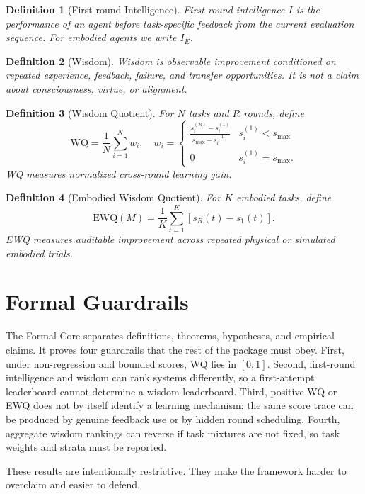 \documentclass[11pt]{article}
\newtheorem{definition}{Definition}
\begin{document}
\begin{definition}[First-round Intelligence]
First-round intelligence $I$ is the performance of an agent before task-specific feedback from the current evaluation sequence.
For embodied agents we write $I_E$.
\end{definition}

\begin{definition}[Wisdom]
Wisdom is observable improvement conditioned on repeated experience, feedback, failure, and transfer opportunities.
It is not a claim about consciousness, virtue, or alignment.
\end{definition}

\begin{definition}[Wisdom Quotient]
For $N$ tasks and $R$ rounds, define
\[
\mathrm{WQ}
= \frac{1}{N}\sum_{i=1}^{N} w_i,\quad
w_i =
\begin{cases}
\frac{s_i^{(R)}-s_i^{(1)}}{s_{\max}-s_i^{(1)}} & s_i^{(1)}<s_{\max}\\
0 & s_i^{(1)}=s_{\max}.
\end{cases}
\]
WQ measures normalized cross-round learning gain.
\end{definition}

\begin{definition}[Embodied Wisdom Quotient]
For $K$ embodied tasks, define
\[
\mathrm{EWQ}(M)=\frac{1}{K}\sum_{t=1}^{K}\left[s_R(t)-s_1(t)\right].
\]
EWQ measures auditable improvement across repeated physical or simulated embodied trials.
\end{definition}

\section{Formal Guardrails}

The Formal Core separates definitions, theorems, hypotheses, and empirical claims.
It proves four guardrails that the rest of the package must obey.
First, under non-regression and bounded scores, WQ lies in $[0,1]$.
Second, first-round intelligence and wisdom can rank systems differently, so a first-attempt leaderboard cannot determine a wisdom leaderboard.
Third, positive WQ or EWQ does not by itself identify a learning mechanism: the same score trace can be produced by genuine feedback use or by hidden round scheduling.
Fourth, aggregate wisdom rankings can reverse if task mixtures are not fixed, so task weights and strata must be reported.

These results are intentionally restrictive.
They make the framework harder to overclaim and easier to defend.
\end{document}
